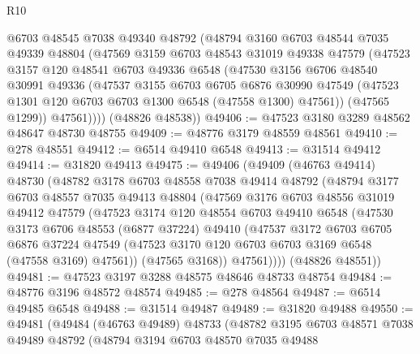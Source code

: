 \begin{lexlean}{R10}
\begin{coremodule}
        @6703
        @48545
        @7038
        @49340
        @48792
        (@48794
          @3160
          @6703
          @48544
          @7035
          @49339
          @48804
          (@47569
            @3159
            @6703
            @48543
            @31019
            @49338
            @47579
            (@47523
              @3157
              @120
              @48541
              @6703
              @49336
              @6548
              (@47530
                @3156
                @6706
                @48540
                @30991
                @49336
                (@47537
                  @3155
                  @6703
                  @6705
                  @6876
                  @30990
                  @47549
                  (@47523 @1301 @120 @6703 @6703 @1300 @6548 (@47558 @1300) @47561))
                (@47565 @1299))
              @47561))))
      (@48826 @48538))
@49406 := @47523 @3180 @3289 @48562 @48647 @48730 @48755
@49409 := @48776 @3179 @48559 @48561
@49410 := @278 @48551
@49412 := @6514 @49410 @6548
@49413 := @31514 @49412
@49414 := @31820 @49413
@49475 := @49406
    (@49409
      (@46763 @49414)
      @48730
      (@48782
        @3178
        @6703
        @48558
        @7038
        @49414
        @48792
        (@48794
          @3177
          @6703
          @48557
          @7035
          @49413
          @48804
          (@47569
            @3176
            @6703
            @48556
            @31019
            @49412
            @47579
            (@47523
              @3174
              @120
              @48554
              @6703
              @49410
              @6548
              (@47530
                @3173
                @6706
                @48553
                (@6877 @37224)
                @49410
                (@47537
                  @3172
                  @6703
                  @6705
                  @6876
                  @37224
                  @47549
                  (@47523 @3170 @120 @6703 @6703 @3169 @6548 (@47558 @3169) @47561))
                (@47565 @3168))
              @47561))))
      (@48826 @48551))
@49481 := @47523 @3197 @3288 @48575 @48646 @48733 @48754
@49484 := @48776 @3196 @48572 @48574
@49485 := @278 @48564
@49487 := @6514 @49485 @6548
@49488 := @31514 @49487
@49489 := @31820 @49488
@49550 := @49481
    (@49484
      (@46763 @49489)
      @48733
      (@48782
        @3195
        @6703
        @48571
        @7038
        @49489
        @48792
        (@48794
          @3194
          @6703
          @48570
          @7035
          @49488

\end{coremodule}
\end{lexlean}
